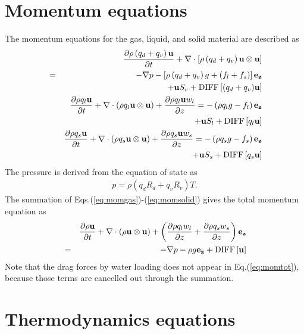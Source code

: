 \section{Momentum equations}

The momentum equations for the gas, liquid, and solid material
are described as
\begin{eqnarray}
&&  \frac{\partial \rho \left(q_d+q_v\right) {\bf u}}{\partial t}
+ \nabla \cdot \left[\rho \left(q_d+q_v\right){\bf u} \otimes {\bf u}\right]\\
&=&
-\nabla p - \left[\rho \left(q_d+q_v\right)g + (f_l+f_s)\right] {\bf e_z}\nonumber\\
&&+{\bf u} S_v +{\rm DIFF}\left[(q_d+q_v){\bf u}\right]
\label{eq:momgas}\\
&&  \frac{\partial \rho q_l {\bf u}}{\partial t}
+ \nabla \cdot \left(\rho q_l{\bf u} \otimes {\bf u}\right)
+ \frac{\partial \rho q_l {\bf u} w_l}{\partial z}
=
 - \left(\rho q_l g - f_l\right) {\bf e_z}\nonumber\\
&&+{\bf u} S_l+{\rm DIFF}\left[q_l{\bf u}\right]
\label{eq:momliquid}\\
&&  \frac{\partial \rho q_s {\bf u}}{\partial t}
+ \nabla \cdot \left(\rho q_s{\bf u} \otimes {\bf u}\right)
+ \frac{\partial \rho q_s {\bf u }w_s}{\partial z}
=
 - \left(\rho q_s g - f_s\right) {\bf e_z}\nonumber\\
&&+{\bf u} S_s+{\rm DIFF}\left[q_s{\bf u}\right]
\label{eq:momsolid}
\end{eqnarray}
The pressure is derived from the equation of state as
\begin{eqnarray}
p=\rho \left(q_d R_d + q_v R_v\right) T.\label{eq:state}
\end{eqnarray}
The summation of Eqs.(\ref{eq:momgas})-(\ref{eq:momsolid})
gives the total momentum equation as
\begin{eqnarray}
&&  \frac{\partial \rho {\bf u}}{\partial t}
+ \nabla \cdot \left(\rho{\bf u} \otimes {\bf u}\right)
+ \left(\frac{\partial \rho q_l w_l}{\partial z}
+ \frac{\partial \rho q_s w_s}{\partial z}\right) {\bf e_z}\nonumber\\
&=&
-\nabla p - \rho g {\bf e_z}
+{\rm DIFF}\left[{\bf u}\right]
\label{eq:momtot}
\end{eqnarray}
Note that the drag forces by water loading does not appear
in Eq.(\ref{eq:momtot}),
because those terms are cancelled out through the summation.

\section{Thermodynamics equations}

